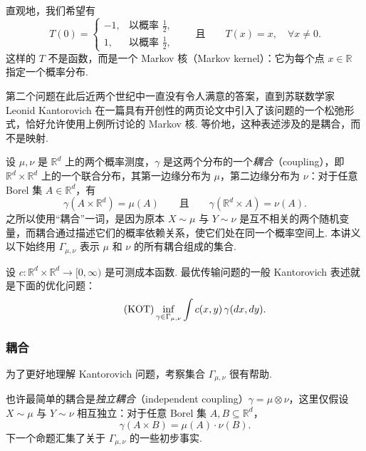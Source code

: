 直观地，我们希望有
$$
T(0)=\begin{cases}
-1,&\text{以概率 }\frac12,\\
1,&\text{以概率 }\frac12,
\end{cases}
\qquad\text{且}\qquad
T(x)=x,\quad\forall x\ne0.
$$
这样的 $T$ 不是函数，而是一个 Markov 核（Markov kernel）：它为每个点 $x\in\mathbb R$ 指定一个概率分布.

第二个问题在此后近两个世纪中一直没有令人满意的答案，直到苏联数学家 Leonid Kantorovich 在一篇具有开创性的两页论文\cite{ref173}中引入了该问题的一个松弛形式，恰好允许使用上例所讨论的 Markov 核. 等价地，这种表述涉及的是耦合，而不是映射.

设 $\mu,\nu$ 是 $\mathbb R^d$ 上的两个概率测度，$\gamma$ 是这两个分布的一个\emph{耦合}（coupling），即 $\mathbb R^d\times\mathbb R^d$ 上的一个联合分布，其第一边缘分布为 $\mu$，第二边缘分布为 $\nu$：对于任意 Borel 集 $A\in\mathbb R^d$，有
$$
\gamma(A\times\mathbb R^d)=\mu(A)
\qquad\text{且}\qquad
\gamma(\mathbb R^d\times A)=\nu(A).
$$
之所以使用“耦合”一词，是因为原本 $X\sim\mu$ 与 $Y\sim\nu$ 是互不相关的两个随机变量，而耦合通过描述它们的概率依赖关系，使它们处在同一个概率空间上. 本讲义以下始终用 $\Gamma_{\mu,\nu}$ 表示 $\mu$ 和 $\nu$ 的所有耦合组成的集合.

设 $c:\mathbb R^d\times\mathbb R^d\to[0,\infty)$ 是可测成本函数. 最优传输问题的一般 Kantorovich 表述就是下面的优化问题：
\begin{equation}\tag{KOT}\label{eq:KOT}\index{Kantorovich problem@Kantorovich问题（Kantorovich problem）|hyperpage}
\inf_{\gamma\in\Gamma_{\mu,\nu}}\int c(x,y)\,\gamma(dx,dy).
\end{equation}

\subsubsection{耦合}\label{sec:1.1.2}

为了更好地理解 Kantorovich 问题，考察集合 $\Gamma_{\mu,\nu}$ 很有帮助.

也许最简单的耦合是\emph{独立耦合}（independent coupling）$\gamma=\mu\otimes\nu$，这里仅假设 $X\sim\mu$ 与 $Y\sim\nu$ 相互独立：对于任意 Borel 集 $A,B\subseteq\mathbb R^d$，
$$
\gamma(A\times B)=\mu(A)\cdot\nu(B).
$$
下一个命题汇集了关于 $\Gamma_{\mu,\nu}$ 的一些初步事实.

